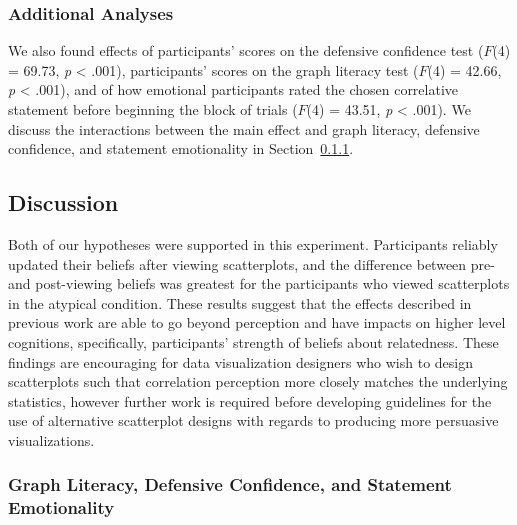 \documentclass[manuscript,screen,review,anonymous]{acmart}
\begin{document}
\subsubsection{Additional Analyses}\label{sec-add-analyses}

We also found effects of participants' scores on the defensive
confidence test (\(F\)(4) = 69.73, \emph{p} \textless{} .001),
participants' scores on the graph literacy test (\(F\)(4) = 42.66,
\emph{p} \textless{} .001), and of how emotional participants rated the
chosen correlative statement before beginning the block of trials
(\(F\)(4) = 43.51, \emph{p} \textless{} .001). We discuss the
interactions between the main effect and graph literacy, defensive
confidence, and statement emotionality in
Section~\ref{sec-add-analyses-discussion}.

\subsection{Discussion}\label{sec-main-discussion}

Both of our hypotheses were supported in this experiment. Participants
reliably updated their beliefs after viewing scatterplots, and the
difference between pre- and post-viewing beliefs was greatest for the
participants who viewed scatterplots in the atypical condition. These
results suggest that the effects described in previous work are able to
go beyond perception and have impacts on higher level cognitions,
specifically, participants' strength of beliefs about relatedness. These
findings are encouraging for data visualization designers who wish to
design scatterplots such that correlation perception more closely
matches the underlying statistics, however further work is required
before developing guidelines for the use of alternative scatterplot
designs with regards to producing more persuasive visualizations.

\subsubsection{Graph Literacy, Defensive Confidence, and Statement
Emotionality}\label{sec-add-analyses-discussion}
\end{document}
